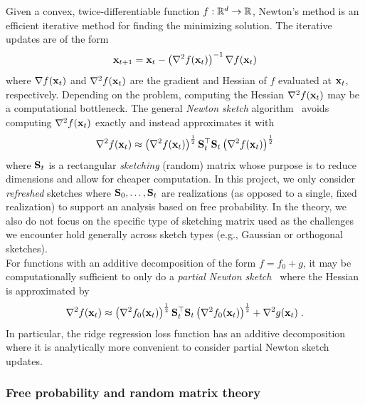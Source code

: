 Given a convex, twice-differentiable function $f:\mathbb{R}^d\rightarrow\mathbb{R}$, Newton's method is an efficient iterative method for finding the minimizing solution. The iterative updates are of the form
\[
\mathbf{x}_{t+1} = \mathbf{x}_t - \left(\nabla^2f(\mathbf{x}_t)\right)^{-1}\nabla f(\mathbf{x}_t)
\]
where $\nabla f(\mathbf{x}_t)$ and $\nabla^2f(\mathbf{x}_t)$ are the gradient and Hessian of $f$ evaluated at $\mathbf{x}_t$, respectively. Depending on the problem, computing the Hessian $\nabla^2f(\mathbf{x}_t)$ may be a computational bottleneck. The general \textit{Newton sketch} algorithm~\citep{Pilanci:2017} avoids computing $\nabla^2f(\mathbf{x}_t)$ exactly and instead approximates it with
\[
\nabla^2f(\mathbf{x}_t) \approx \left(\nabla^2f(\mathbf{x}_t)\right)^\frac{1}{2}\mathbf{S}_t^\top\mathbf{S}_t\left(\nabla^2f(\mathbf{x}_t)\right)^\frac{1}{2}
\]
where $\mathbf{S}_t$ is a rectangular \textit{sketching} (random) matrix whose purpose is to reduce dimensions and allow for cheaper computation. In this project, we only consider \textit{refreshed} sketches where $\mathbf{S}_0,\ldots,\mathbf{S}_t$ are \iid realizations (as opposed to a single, fixed realization) to support an analysis based on free probability. In the theory, we also do not focus on the specific type of sketching matrix used as the challenges we encounter hold generally across sketch types (e.g., \iid Gaussian or orthogonal sketches).
\\

For functions with an additive decomposition of the form $f=f_0+g$, it may be computationally sufficient to only do a \textit{partial Newton sketch}~\citep{Pilanci:2017} where the Hessian is approximated by
\[
\nabla^2f(\mathbf{x}_t) \approx \left(\nabla^2f_0(\mathbf{x}_t)\right)^\frac{1}{2}\mathbf{S}_t^\top\mathbf{S}_t\left(\nabla^2f_0(\mathbf{x}_t)\right)^\frac{1}{2} + \nabla^2g(\mathbf{x}_t) \;.
\]
In particular, the ridge regression loss function has an additive decomposition where it is analytically more convenient to consider partial Newton sketch updates.

\subsubsection{Free probability and random matrix theory} \label{sec:freeprob}

